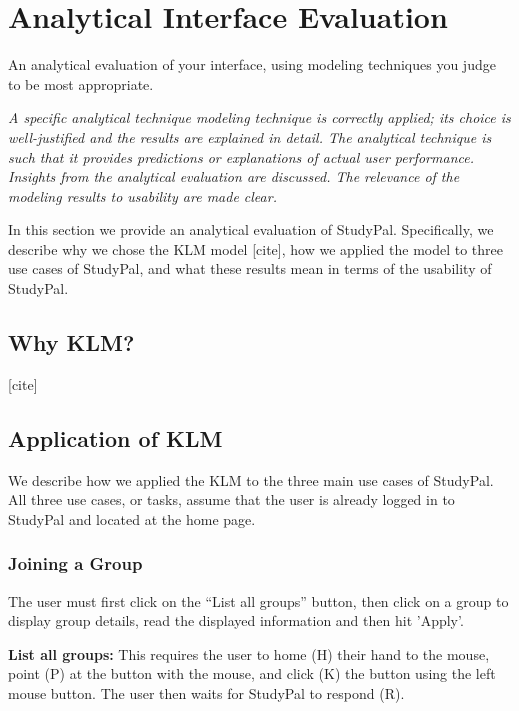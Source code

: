 \documentclass[conference]{IEEEtran}
\begin{document}
\section{Analytical Interface Evaluation}
An analytical evaluation of your interface, using modeling techniques you judge to be most appropriate. 
 
\emph{A specific analytical technique modeling technique is correctly applied; its choice is well-justified and the results are explained in detail. The analytical technique is such that it provides predictions or explanations of actual user performance. Insights from the analytical evaluation are discussed. The relevance of the modeling results to usability are made clear.}

 
In this section we provide an analytical evaluation of StudyPal.
Specifically, we describe why we chose the KLM model [cite], how we applied the model to three use cases of StudyPal, and what these results mean in terms of the usability of StudyPal.

\subsection{Why KLM?}
[cite]


\subsection{Application of KLM}
We describe how we applied the KLM to the three main use cases of StudyPal.
All three use cases, or tasks, assume that the user is already logged in to StudyPal and located at the home page.

\subsubsection{Joining a Group}
The user must first click on the ``List all groups'' button, then click on a group to display group details, read the displayed information and then hit 'Apply'.

\textbf{List all groups:}
This requires the user to home (H) their hand to the mouse, point (P) at the button with the mouse, and click (K) the button using the left mouse button.
The user then waits for StudyPal to respond (R).
\end{document}
